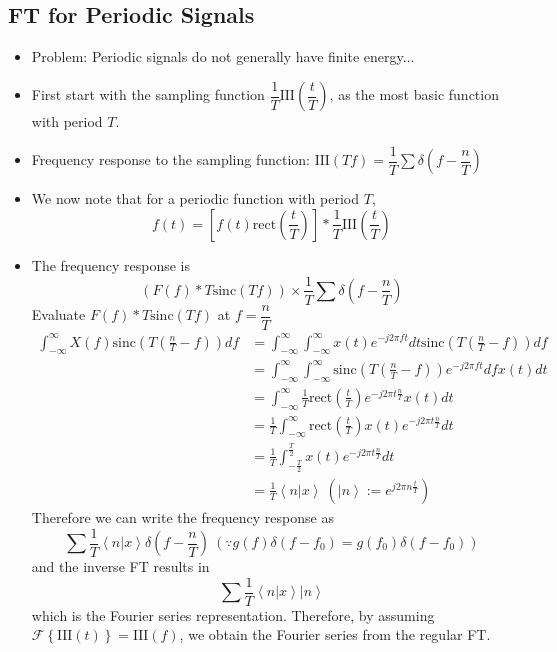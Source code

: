 \documentclass{article}
\begin{document}
\subsection{FT for Periodic Signals}
\begin{itemize}
    \item Problem: Periodic signals do not generally have finite energy...
    \item First start with the sampling function $\dfrac{1}{T}\mathrm{III}(\dfrac{t}{T})$, as the most basic function with period $T$.
    \item Frequency response to the sampling function: $\mathrm{III}(Tf)=\dfrac{1}{T}\displaystyle\sum\delta\left(f-\dfrac{n}{T}\right)$
    \item We now note that for a periodic function with period $T$, \[f(t)=\left[f(t)\mathrm{rect}\left(\frac{t}{T}\right)\right]*\frac{1}{T}\mathrm{III}(\frac{t}{T})\]
    \item The frequency response is
    \[
    (F(f)*T\mathrm{sinc}(Tf))\times\frac{1}{T}\sum{\delta\left(f-\frac{n}{T}\right)}
    \]
    Evaluate $F(f)*T\mathrm{sinc}(Tf)$ at $f=\dfrac{n}{T}$
    \begin{align*}
        \int_{-\infty}^{\infty}{X(f)\mathrm{sinc}\left(T\left(\frac{n}{T}-f\right)\right)df} &= \int_{-\infty}^{\infty}{\int_{-\infty}^{\infty}{x(t)e^{-j2\pi ft}dt}\mathrm{sinc}\left(T\left(\frac{n}{T}-f\right)\right)df}\\
        &=\int_{-\infty}^{\infty}{\int_{-\infty}^{\infty}{\mathrm{sinc}\left(T\left(\frac{n}{T}-f\right)\right)e^{-j2\pi ft}df}x(t)dt}\\
        &=\int_{-\infty}^{\infty}{\frac{1}{T}\mathrm{rect}\left(\frac{t}{T}\right)e^{-j2\pi t\frac{n}{T}}x(t)dt}\\
        &=\frac{1}{T}\int_{-\infty}^{\infty}{\mathrm{rect}\left(\frac{t}{T}\right)x(t)e^{-j2\pi t\frac{n}{T}}dt}\\
        &=\frac{1}{T}\int_{-\frac{T}{2}}^{\frac{T}{2}}{x(t)e^{-j2\pi t\frac{n}{T}}dt}\\
        &=\frac{1}{T}\left<n|x\right>\:(\left|n\right>:=e^{j2\pi n \frac{t}{T}})
    \end{align*}
    Therefore we can write the frequency response as
    \[
    \sum{\frac{1}{T}\left<n|x\right>\delta\left(f-\frac{n}{T}\right)}\:(\because g(f)\delta\left(f-f_0\right)=g(f_0)\delta\left(f-f_0\right))
    \]
    and the inverse FT results in
    \[
    \sum{\frac{1}{T}\left<n|x\right>\left|n\right>}
    \]
    which is the Fourier series representation. Therefore, by assuming $\mathcal{F}\left\{\mathrm{III}(t)\right\}=\mathrm{III}(f)$, we obtain the Fourier series from the regular FT.

\end{itemize}
\end{document}
